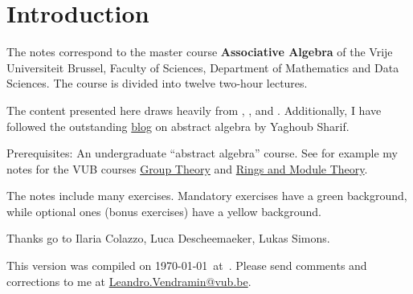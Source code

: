 \thispagestyle{plain}
\section*{Introduction}

The notes correspond to the master  
course \textbf{Associative Algebra} of the 
Vrije Universiteit Brussel, 
Faculty of Sciences, 
Department of Mathematics and Data Sciences. The course
is divided into twelve two-hour lectures. 

The content presented here draws heavily from \cite{MR3308118}, \cite{MR1449137}, 
and \cite{MR798076}. Additionally, I have 
followed the outstanding \href{https://ysharifi.wordpress.com}{blog} on 
abstract algebra by Yaghoub Sharif.

Prerequisites: An undergraduate ``abstract algebra'' course. See for example
my notes for the VUB courses \href{https://github.com/vendramin/group}{Group Theory}  and \href{https://github.com/vendramin/rings}{Rings and Module Theory}. 

The notes include many exercises. Mandatory exercises have a \colorbox{green!5!white}{green background}, while optional ones (bonus exercises) have a \colorbox{yellow!15!white}{yellow background}.

Thanks go to Ilaria Colazzo, 
Luca Descheemaeker, Lukas Simons.   

This version 
was compiled on \today~at~\currenttime.
Please send comments and corrections to me at \url{Leandro.Vendramin@vub.be}. 


